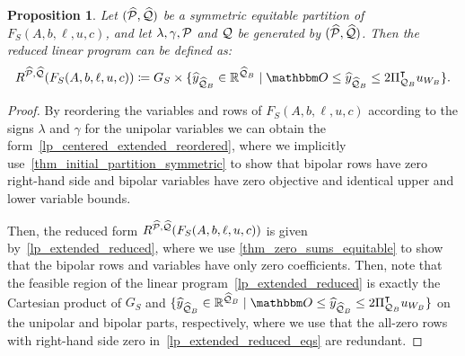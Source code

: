 \documentclass[pdflatex,sn-mathphys-num]{sn-jnl}%
\theoremstyle{thmstyleone}%
\newtheorem{proposition}[proposition]{Proposition}
\theoremstyle{thmstylethree}%
\theoremstyle{thmstyletwo}%
\begin{document}
\begin{proposition}
    \label{thm_split_reduce_equiv_reduce_split}
    Let $(\widehat{\mathcal{P}},\widehat{\mathcal{Q}})$ be a symmetric equitable partition of $F_S(A,b,\ell,u,c)$, and let $\lambda,\gamma,\mathcal{P}$ and $\mathcal{Q}$ be generated by $(\widehat{\mathcal{P}},\widehat{\mathcal{Q}})$. Then the reduced linear program can be defined as: 
    \begin{equation*}
        R^{\widehat{\MP},\widehat{\MQ}}(F_S(A,b,\ell,u,c)) \coloneqq G_S \times \{ \widehat{y}_{\widehat{\MQ}_B}\in \R^{\widehat{\MQ}_B} \mid \zerovec \leq \widehat{y}_{\widehat{\MQ}_B} \leq 2\transpose{\Pi_{\MQ_B}} u_{W_B}\}.
    \end{equation*}
\end{proposition}
\begin{proof}
    By reordering the variables and rows of $F_S(A,b,\ell,u,c)$ according to the signs $\lambda$ and $\gamma$ for the unipolar variables we can obtain the form~\eqref{lp_centered_extended_reordered}, where we implicitly use~\cref{thm_initial_partition_symmetric} to show that bipolar rows have zero right-hand side and bipolar variables have zero objective and identical upper and lower variable bounds.
    
    Then, the reduced form $R^{\widehat{\mathcal{P}},\widehat{\mathcal{Q}}}(F_S(A,b,\ell,u,c))$ is given by~\eqref{lp_extended_reduced}, where we use \cref{thm_zero_sums_equitable} to show that the bipolar rows and variables have only zero coefficients. Then, note that the feasible region of the linear program~\eqref{lp_extended_reduced} is exactly the Cartesian product of $G_S$ and $\{ \widehat{y}_{\widehat{\MQ}_B}\in \R^{\widehat{\MQ}_B} \mid \zerovec \leq \widehat{y}_{\widehat{\MQ}_B} \leq 2\transpose{\Pi_{\MQ_B}} u_{W_B}\}$ on the unipolar and bipolar parts, respectively, where we use that the all-zero rows with right-hand side zero in~\eqref{lp_extended_reduced_eqs} are redundant.
\end{proof}
\end{document}
